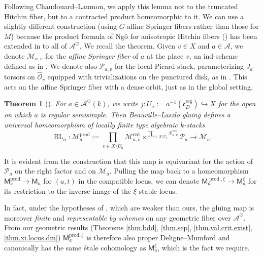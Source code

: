 \documentclass[openany]{amsbook}
\newtheorem{theorem}{Theorem}[chapter]
\theoremstyle{definition}
\theoremstyle{remark}
\numberwithin{equation}{section}
\renewcommand{\O}{\mathcal{O}}
\newcommand{\cA}{\mathcal{A}}
\newcommand{\cM}{\mathcal{M}}
\newcommand{\cP}{\mathcal{P}}
\newcommand{\red}{\mathrm{red}}
\renewcommand{\-}{\operatorname{-}}
\newcommand{\on}[1]{\operatorname{#1}}
\newcommand{\reg}{\on{reg}}
\newcommand{\bM}{\mathsf{M}}
\newcommand{\fc}{\mathfrak{c}}
\begin{document}
Following Chaudouard--Laumon, we apply this lemma not to the truncated Hitchin fiber, but to a contracted product homeomorphic to it. We can use a slightly different construction (using $G$-affine Springer fibers rather than those for $M$) because the product formula of Ng\^{o} for anisotropic Hitchin fibers (\cite[4.15.1]{ngofl}) has been extended in \cite{bouthierprodform} to all of $\cA^{\heartsuit}$. We recall the theorem. Given $v \in X$ and $a \in \cA$, we denote $\cM_{a,v}$ for the \textit{affine Springer fiber} of $a$ at the place $v$, an ind-scheme defined as in \cite[\S 3.2]{ngofl}. We denote also $\cP_{a,v}$ for the local Picard stack, parameterizing $J_a$-torsors on $\widehat{\O}_v$ equipped with trivializations on the punctured disk, as in \cite[\S 3.3]{ngofl}. This acts on the affine Springer fiber with a dense orbit, just as in the global setting.

\begin{theorem}[{{\cite[Theorem 4.3.8]{bouthierprodform}}}]\label{thm.bouthier.prod.gluing}
    For $a \in \cA^{\heartsuit}(k)$, we write $j : U_a := a^{-1}(\fc_{D}^{\reg}) \hookrightarrow X$ for the open on which $a$ is regular semisimple. Then Beauville--Laszlo gluing defines a universal homeomorphism of locally finite type algebraic $k$-stacks 
    $$
        \on{BL}_a : \cM_a^{\on{prod}} := \prod_{v \in X \setminus U_a} \cM_{a,v}^{\red} \times^{\prod_{v \in X\setminus U_a} \cP_{a,v}^{\red}} \cP_a \longrightarrow \cM_a.
    $$
\end{theorem}
It is evident from the construction that this map is equivariant for the action of $\cP_a$ on the right factor and on $\cM_a$. Pulling the map back to a homeomorphism $\bM_a^{\on{prod}} \to \bM_a$ for $(a,t)$ in the compatible locus, we can denote $\bM_a^{\on{prod}, \xi} \to \bM_a^\xi$ for its restriction to the inverse image of the $\xi$-stable locus. 

In fact, under the hypotheses of \cite[Theorem 4.3.8(a)]{bouthierprodform}, which are weaker than ours, the gluing map is moreover \emph{finite} and \emph{representable by schemes} on any geometric fiber over $\cA^{\heartsuit}$. From our geometric results (Theorems \ref{thm.bdd}, \ref{thm.sep}, \ref{thm.val.crit.exist}, \ref{thm.xi.locus.dm}) $\bM_a^{\mathrm{prod},\xi}$ is therefore also proper Deligne–Mumford and canonically has the same étale cohomology as $\bM_a^\xi$, which is the fact we require.
\end{document}
